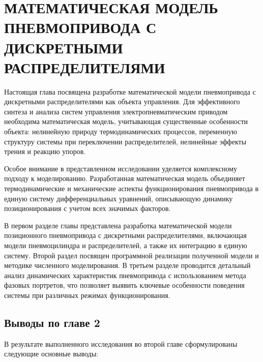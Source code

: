 \chapter{МАТЕМАТИЧЕСКАЯ МОДЕЛЬ ПНЕВМОПРИВОДА С ДИСКРЕТНЫМИ РАСПРЕДЕЛИТЕЛЯМИ}\label{ch:ch2}
Настоящая глава посвящена разработке математической модели пневмопривода с дискретными
распределителями как объекта управления. Для эффективного синтеза и анализа систем управления
электропневматическим приводом необходима математическая модель, учитывающая существенные
особенности объекта: нелинейную природу термодинамических процессов, переменную структуру системы при переключении
распределителей, нелинейные эффекты трения и реакцию упоров.

Особое внимание в представленном исследовании уделяется комплексному подходу к моделированию. Разработанная
математическая модель объединяет термодинамические и механические аспекты функционирования пневмопривода в
единую систему дифференциальных уравнений, описывающую динамику позиционирования с учетом всех значимых факторов.

В первом разделе главы представлена разработка математической модели позиционного пневмопривода с дискретными
распределителями, включающая модели пневмоцилиндра и распределителей, а также их интеграцию в единую систему.
Второй раздел посвящен программной реализации полученной модели и методике численного моделирования. В третьем
разделе проводится детальный анализ динамических характеристик пневмопривода с использованием метода фазовых портретов,
что позволяет выявить ключевые особенности поведения системы при различных режимах функционирования.






\section{Выводы по главе 2}

В результате выполненного исследования во второй главе сформулированы следующие основные выводы:

